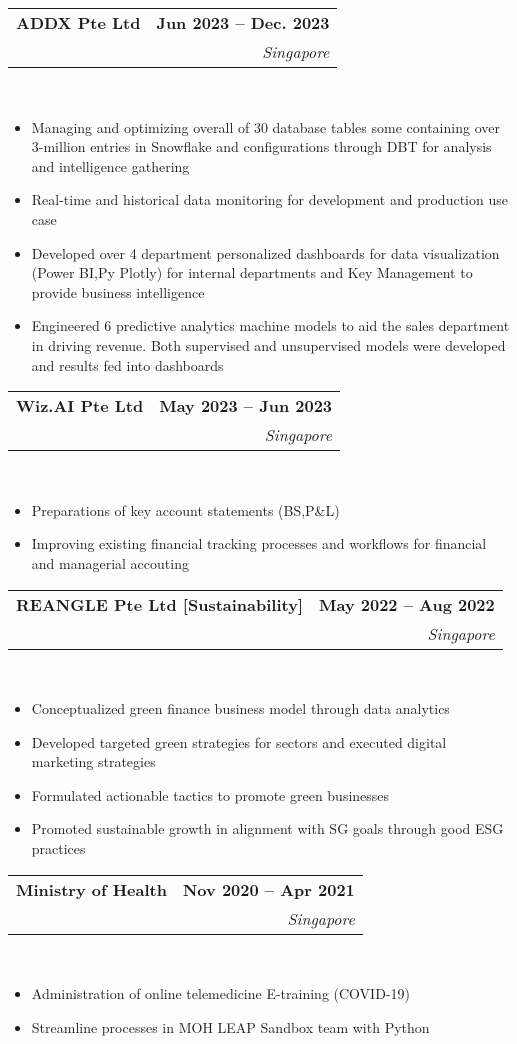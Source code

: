 \documentclass[10pt,a4paper]{article}
\makeatletter
\newcommand{\cvtaglinefirstfontsize}{11}  %
\newcommand{\cvtaglinesecondfontsize}{10} %
\newcommand{\cvbulletfontsize}{10}        %
\newcommand{\cvtagline}[5][1em]{
  \vspace{-1em} %
  \noindent\begin{tabularx}{\textwidth}{@{}Xr@{}}
    {\fontsize{\cvtaglinefirstfontsize}{\cvtaglinefirstfontsize}\selectfont\textbf{#2}} & 
    {\fontsize{\cvtaglinefirstfontsize}{\cvtaglinefirstfontsize}\selectfont\textbf{#3}} \\ %
    {\fontsize{\cvtaglinesecondfontsize}{\cvtaglinesecondfontsize}\selectfont{#4}} & 
    {\fontsize{\cvtaglinesecondfontsize}{\cvtaglinesecondfontsize}\selectfont\textit{#5}} \\ %
  \end{tabularx}
  \\
  \vspace{#1} %
}
\newcommand{\cvbullets}[2][1em]{
  \vspace{-2.1em} %
  {\fontsize{\cvbulletfontsize}{\cvbulletfontsize}\selectfont
    \begin{itemize}[left=0pt,labelsep=1em]
      \setlength\itemsep{0.2em} %
      \setlength\labelwidth{1em} %
      \setlength\parskip{0pt} %
      #2
    \end{itemize}
  }
  \vspace{#1} %
}
\makeatother
\begin{document}
\cvtagline{ADDX Pte Ltd}{Jun 2023 -- Dec. 2023}{Data Analytics Intern $ | $ Supervisor: Yogesh [Data team lead]}{Singapore}

\cvbullets{
  \item Managing and optimizing overall of 30 database tables some containing over
  3-million entries in Snowflake and configurations through DBT for analysis and
  intelligence gathering
  \item Real-time and historical data monitoring for development and production use
  case
  \item Developed over 4 department personalized dashboards for data visualization
  (Power BI,Py Plotly) for internal departments and Key Management to provide
  business intelligence
  \item Engineered 6 predictive analytics machine models to aid the sales department in
  driving revenue. Both supervised and unsupervised models were developed and
  results fed into dashboards }

\cvtagline{Wiz.AI Pte Ltd}{May 2023 -- Jun 2023}{Finance Intern $ | $ Supervisor: Andy Teo [Finance director]}{Singapore}

\cvbullets{
  \item Preparations of key account statements (BS,P\&L)
  \item Improving existing financial tracking processes and workflows for financial and
  managerial accouting }

\cvtagline{REANGLE Pte Ltd [Sustainability]}{May 2022 -- Aug 2022}{Data Analyst Intern}{Singapore}

\cvbullets{
  \item Conceptualized green finance business model through data analytics
  \item Developed targeted green strategies for sectors and executed digital marketing
  strategies
  \item Formulated actionable tactics to promote green businesses
  \item Promoted sustainable growth in alignment with SG goals through good ESG
  practices }

\cvtagline{Ministry of Health}{Nov 2020 -- Apr 2021}{Engagement \& Strategy Intern $ | $ Supervisor: Weng Chee}{Singapore}

\cvbullets{
  \item Administration of online telemedicine E-training (COVID-19)
  \item Streamline processes in MOH LEAP Sandbox team with Python }
\end{document}
